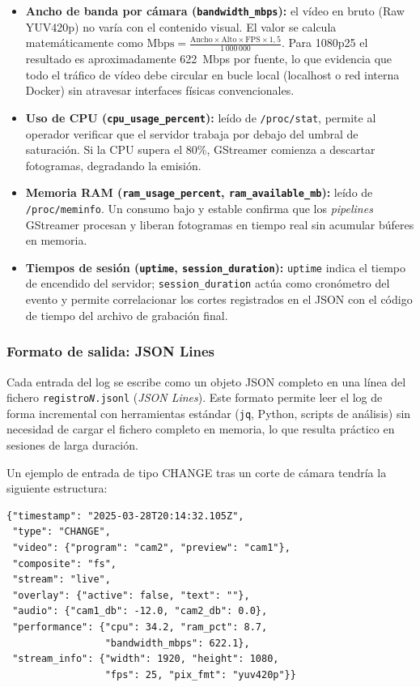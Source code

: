 \begin{itemize}
  \item \textbf{Ancho de banda por cámara (\texttt{bandwidth\_mbps}):} el vídeo en
        bruto (Raw YUV420p) no varía con el contenido visual. El valor se calcula
        matemáticamente como $\text{Mbps} = \frac{\text{Ancho} \times \text{Alto}
        \times \text{FPS} \times 1{,}5}{1\,000\,000}$. Para 1080p25 el resultado es
        aproximadamente 622~Mbps por fuente, lo que evidencia que todo el tráfico
        de vídeo debe circular en bucle local (localhost o red interna Docker) sin
        atravesar interfaces físicas convencionales.
  \item \textbf{Uso de CPU (\texttt{cpu\_usage\_percent}):} leído de \texttt{/proc/stat},
        permite al operador verificar que el servidor trabaja por debajo del umbral de
        saturación. Si la CPU supera el 80\%, GStreamer comienza a descartar fotogramas,
        degradando la emisión.
  \item \textbf{Memoria RAM (\texttt{ram\_usage\_percent}, \texttt{ram\_available\_mb}):}
        leído de \texttt{/proc/meminfo}. Un consumo bajo y estable confirma que los
        \textit{pipelines} GStreamer procesan y liberan fotogramas en tiempo real sin acumular
        búferes en memoria.
  \item \textbf{Tiempos de sesión (\texttt{uptime}, \texttt{session\_duration}):}
        \texttt{uptime} indica el tiempo de encendido del servidor; \texttt{session\_duration}
        actúa como cronómetro del evento y permite correlacionar los cortes registrados
        en el JSON con el código de tiempo del archivo de grabación final.
\end{itemize}

\subsubsection{Formato de salida: JSON Lines}

Cada entrada del log se escribe como un objeto JSON completo en una línea del fichero
\texttt{registro\textit{N}.jsonl} (\textit{JSON Lines}). Este formato permite leer el
log de forma incremental con herramientas estándar (\texttt{jq}, Python, scripts de
análisis) sin necesidad de cargar el fichero completo en memoria, lo que resulta
práctico en sesiones de larga duración.

Un ejemplo de entrada de tipo CHANGE tras un corte de cámara tendría la siguiente
estructura:

\begin{verbatim}
{"timestamp": "2025-03-28T20:14:32.105Z",
 "type": "CHANGE",
 "video": {"program": "cam2", "preview": "cam1"},
 "composite": "fs",
 "stream": "live",
 "overlay": {"active": false, "text": ""},
 "audio": {"cam1_db": -12.0, "cam2_db": 0.0},
 "performance": {"cpu": 34.2, "ram_pct": 8.7,
                 "bandwidth_mbps": 622.1},
 "stream_info": {"width": 1920, "height": 1080,
                 "fps": 25, "pix_fmt": "yuv420p"}}
\end{verbatim}

